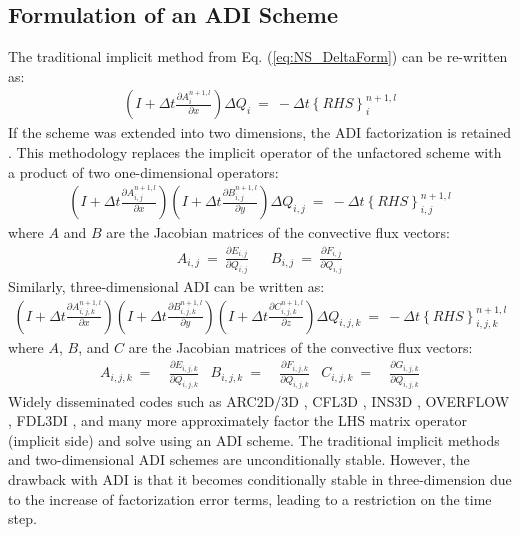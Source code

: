 \documentclass[conf]{new-aiaa}
\begin{document}
\subsection{Formulation of an ADI Scheme}
The traditional implicit method from Eq. (\ref{eq:NS_DeltaForm}) can be re-written as: 
\begin{equation}
	\begin{split}
		\label{eq:TriDi}
  			\left(I+\Delta{t}\frac{\partial{A_i^{n+1,l}}}{\partial{x}}\right)\Delta{Q}_i~=~-\Delta{t}\left\{RHS\right\}_i^{n+1, l}
	\end{split}
\end{equation}
If the scheme was extended into two dimensions, the ADI factorization is retained \cite{Beam, Briley}. This methodology replaces the implicit operator of the unfactored scheme with a product of two one-dimensional operators: 
\begin{equation}
	\begin{split}
		\label{eq:ADI}
  			\left(I+\Delta{t}\frac{\partial{A_{i,j}^{n+1,l}}}{\partial{x}}\right)\left(I+\Delta{t}\frac{\partial{B_{i,j}^{n+1,l}}}{\partial{y}}\right)\Delta{Q}_{i,j}~=~-\Delta{t}\left\{RHS\right\}_{i,j}^{n+1, l}
	\end{split}
\end{equation}
where $A$ and $B$ are the Jacobian matrices of the convective flux vectors:
\begin{align}
	A_{i,j}~=~\frac{\partial{E_{i,j}}}{\partial{Q_{i,j}}} & &
  			B_{i,j}~=~\frac{\partial{F_{i,j}}}{\partial{Q_{i,j}}}
\end{align}
Similarly, three-dimensional ADI can be written as:
\begin{equation}
	\begin{split}
		\label{eq:3ADI}
  			\left(I+\Delta{t}\frac{\partial{A_{i,j,k}^{n+1,l}}}{\partial{x}}\right)\left(I+\Delta{t}\frac{\partial{B_{i,j,k}^{n+1,l}}}{\partial{y}}\right)\left(I+\Delta{t}\frac{\partial{C_{i,j,k}^{n+1,l}}}{\partial{z}}\right)\Delta{Q}_{i,j,k}~=~-\Delta{t}\left\{RHS\right\}_{i,j,k}^{n+1, l}
	\end{split}
\end{equation}
where $A$, $B$, and $C$ are the Jacobian matrices of the convective flux vectors:
\begin{align}
 	A_{i,j,k}~=&~\frac{\partial{E_{i,j,k}}}{\partial{Q_{i,j,k}}} &
  	B_{i,j,k}~=&~\frac{\partial{F_{i,j,k}}}{\partial{Q_{i,j,k}}} &
  	C_{i,j,k}~=&~\frac{\partial{G_{i,j,k}}}{\partial{Q_{i,j,k}}}
\end{align}
Widely disseminated codes such as ARC2D/3D \cite{ARC2D, ARC3D}, CFL3D \cite{CFL3D}, INS3D \cite{INS3D}, OVERFLOW \cite{OVERFLOW}, FDL3DI \cite{FDL3DI_A, FDL3DI_B, FDL3DI_C}, and many more approximately factor the LHS matrix operator (implicit side) and solve using an ADI scheme. 
The traditional implicit methods and two-dimensional ADI schemes are unconditionally stable. 
However, the drawback with ADI is that it becomes conditionally stable in three-dimension due to the increase of factorization error terms, leading to a restriction on the time step. 
\end{document}
